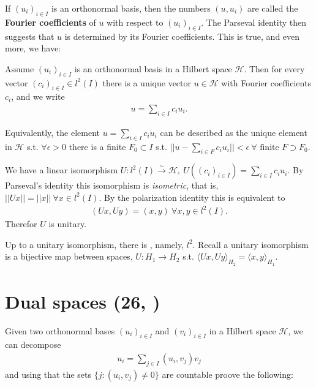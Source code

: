 If \((u_i)_{i\in I }\) is an orthonormal basis, then the numbers \((u,u_i)\) are called the \textbf{Fourier coefficients} of \(u\) with 
respect to \((u_i)_{i\in I}\). The Parseval identity then suggests that \(u\) is determined by its Fourier coefficients. This is true, 
and even more, we have:
\begin{proposition}
    Assume \((u_i)_{i\in I}\) is an orthonormal basis in a Hilbert space \(\mathcal{H}\). Then for every vector \((c_i)_{i\in I}\in l^2(I)\)
    there is a unique vector \(u\in \mathcal{H}\) with Fourier coefficients \(c_i\), and we write
    \begin{align*}
        u = \sum\limits_{i\in I} c_i u_i.
    \end{align*}
\end{proposition}
\begin{remark}
    Equivalently, the element \(u=\sum_{i\in I}c_i u_i\) can be described as the unique element in \(\mathcal{H}\) s.t. \(\forall \epsilon>0\)
    there is a finite \(F_0\subset I\) s.t. \(||u - \sum_{i\in F}c_i u_i || < \epsilon \ \forall \text{ finite } F\supset F_0\).
\end{remark}
\begin{corollary}
    We have a linear isomorphism \(U:l^2(I)\xrightarrow[ ]{\sim}\mathcal{H}, \ U\left((c_i)_{i\in I}\right) = \sum_{i\in I}c_i u_i\).
    By Parseval's identity this isomorphism is \emph{isometric}, that is, \(||Ux|| = ||x|| \ \forall x\in l^2(I)\). By the polarization identity
    this is equivalent to 
    \begin{align*}
        (Ux,Uy) = (x,y) \ \forall x,y\in l^2(I).
    \end{align*}
    Therefor \(U\) is unitary.
\end{corollary}
\begin{corollary}
    Up to a unitary isomorphism, there is , namely, \(l^2\). Recall a unitary isomorphism is a bijective map between spaces, \(U:H_1\rightarrow H_2\) s.t. \(\langle Ux, Uy\rangle_{H_2} = \langle x,y\rangle_{H_1}\).
\end{corollary}

\section{Dual spaces \tiny{(26, \cite{schilling2017measures})}}
Given two orthonormal bases \((u_i)_{i\in I}\) and \((v_i)_{i\in I}\) in a Hilbert space \(\mathcal{H}\), we can decompose
\begin{align*}
    u_i = \sum\limits_{j\in I} (u_i,v_j)v_j
\end{align*}
and using that the sets \(\{j:(u_i,v_j)\neq 0\}\) are countable proove the following:

